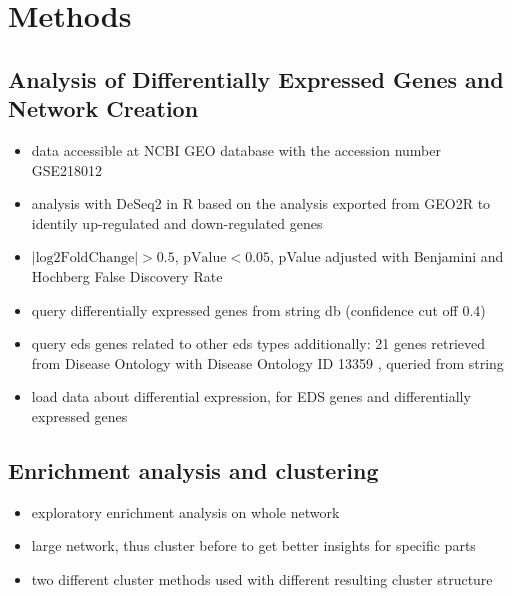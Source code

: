 \section{Methods}

\subsection{Analysis of Differentially Expressed Genes and Network Creation}\label{sec:methods-deg}
\begin{itemize}
	\item data accessible at NCBI GEO database with the accession number GSE218012 \cite{Ritelli2020} 
	\item analysis with DeSeq2 in R based on the analysis exported from GEO2R \cite{DESeq2} to identily up-regulated and down-regulated genes
	\item $|\text{log2FoldChange}| > 0.5$, $\text{pValue} <0.05$, pValue adjusted with Benjamini and Hochberg False Discovery Rate
\end{itemize}

\begin{itemize}
	\item query differentially expressed genes from string db \cite{StringDB} (confidence cut off 0.4)
	\item query eds genes related to other eds types additionally: 21 genes retrieved from Disease Ontology with Disease Ontology ID 13359 \cite{DO}, queried from string
	\item load data about differential expression, for EDS genes and differentially expressed genes
\end{itemize}

\subsection{Enrichment analysis and clustering}
\begin{itemize}
	\item exploratory enrichment analysis on whole network
	\item large network, thus cluster before to get better insights for specific parts
	\item two different cluster methods used with different resulting cluster structure
\end{itemize}

